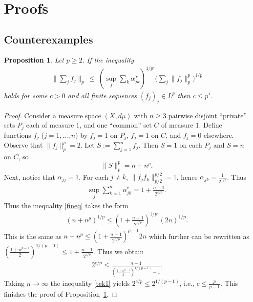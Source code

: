 \documentclass[11pt]{article}
\newtheorem{proposition}[theorem]{Proposition}
\theoremstyle{definition}
\newcommand{\1}{\mathbf{1}}
\begin{document}
\section{Proofs}

\subsection{Counterexamples}\label{jos1}

\begin{proposition}\label{jos0101}
Let $p\geq 2$. If the inequality 
\begin{align}\label{fineq}
\Big\|\sum_j f_j\Big\|_p \ \le\  \left(\sup_{j} \sum_{k} \alpha_{jk}^{\,c}\right)^{1/p'} \Big(\sum_j \|f_j\|_p^p\Big)^{1/p}
\end{align}
holds for some $c>0$ and all finite sequences $(f_{j})_{j} \in L^{p}$ then $c\leq p'$. 
\end{proposition}
\begin{proof}

    Consider a measure space $(X, d\mu)$  with $n \geq 3$ pairwise disjoint ``private'' sets $P_j$ each of measure $1$, and one ``common'' set $C$ of measure $1$. Define functions $f_j$ ($j = 1, \dots, n$) by $f_j = 1$ on $P_j$, $f_j = 1$ on $C$, and $f_j = 0$ elsewhere. Observe that $\|f_j\|_p^p = 2$.  Let $S := \sum_{j=1}^{n} f_j$. Then $S = 1$ on each $P_j$ and $S = n$ on $C$, so
\[
\|S\|_p^p = n + n^p.
\]
Next, notice that $\alpha_{jj}=1$. For each $j\neq k$, $\| f_{j}f_{k}\|_{p/2}^{p/2}=1$, hence $\alpha_{jk} = \frac{1}{2^{1/p}}$. Thus 
\begin{align*}
   \sup_{j}\sum_{k=1}^{n}\alpha_{jk}^{c} =  1 +  \frac{n-1}{2^{c/p}}.
\end{align*}
Thus the inequality \eqref{fineq} takes the form 
\begin{align*}
(n+n^{p})^{1/p}\leq \left(1 + \frac{n-1}{2^{c/p}}\right)^{1/p'}(2n)^{1/p}.
\end{align*}
This is the same as $n+n^{p} \leq \left(1+\frac{n-1}{2^{c/p}}\right)^{p-1} 2n$ which further can be rewritten as $\left(\frac{1+n^{p-1}}{2}\right)^{1/(p-1)}\leq 1+\frac{n-1}{2^{c/p}}$. Thus we obtain 
\begin{align}\label{tek1}
    2^{c/p} \leq \frac{n-1}{\left(\frac{1+n^{p-1}}{2}\right)^{1/(p-1)}-1}.
\end{align}
Taking $n \to \infty$ the inequality \eqref{tek1} yields $2^{c/p}\leq 2^{1/(p-1)}$, i.e., $c \leq \frac{p}{p-1}$. This finishes the proof of Proposition~\ref{jos0101}.
\end{proof}
\end{document}
